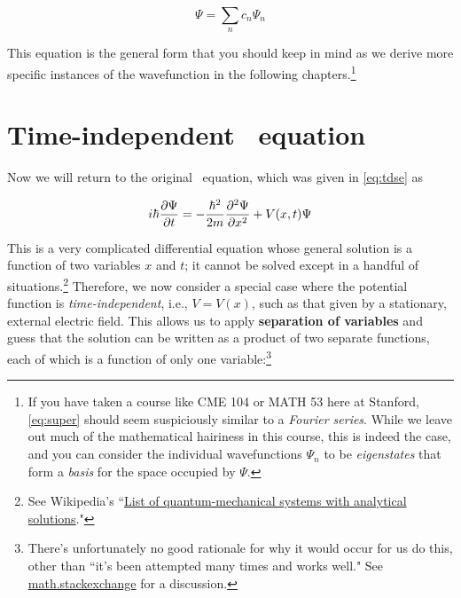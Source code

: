 \begin{tcolorbox}[title=Superposition of wavefunctions] \vspace{-2ex}
	\begin{equation}
		\Psi = \sum_n c_n\Psi_n  \label{eq:super}
	\end{equation}
\end{tcolorbox}

This equation is the general form that you should keep in mind as we derive more specific instances of the wavefunction in the following chapters.\footnote{If you have taken a course like CME 104 or MATH 53 here at Stanford, \autoref{eq:super} should seem suspiciously similar to a \emph{Fourier series}. While we leave out much of the mathematical hairiness in this course, this is indeed the case, and you can consider the individual wavefunctions $\Psi_n$ to be \emph{eigenstates} that form a \emph{basis} for the space occupied by $\Psi$.}


\section[Time-independence]{Time-independent \Sch\ equation}

Now we will return to the original \Sch\ equation, which was given in \autoref{eq:tdse} as

\begin{equation*}
	i\hbar \pdv{\Psi}{t} = -\frac{\hbar^2}{2m} \pdv[2]{\Psi}{x} + V(x,t)\Psi
\end{equation*}

This is a very complicated differential equation whose general solution is a function of two variables $x$ and $t$;
it cannot be solved except in a handful of situations.\footnote{See Wikipedia's ``\href{https://en.wikipedia.org/wiki/List_of_quantum-mechanical_systems_with_analytical_solutions}{List of quantum-mechanical systems with analytical solutions}."}
Therefore, we now consider a special case where the potential function is \emph{time-independent}, i.e., $V = V(x)$, such as that given by a stationary, external electric field. 
This allows us to apply \textbf{separation of variables} and guess that the solution can be written as a product of two separate functions, each of which is a function of only one variable:\footnote{There's unfortunately no good rationale for why it would occur for us do this, other than ``it's been attempted many times and works well." See \href{https://math.stackexchange.com/questions/575205/why-separation-of-variables-works-in-pdes}{math.stackexchange} for a discussion.} 

